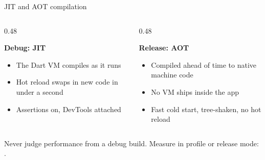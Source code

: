 \documentclass[10pt,aspectratio=169,t]{beamer}
\begin{document}
\begin{frame}[fragile,eyebrow=Flutter]{JIT and AOT compilation}
  \begin{columns}[T]
    \begin{column}{0.48\textwidth}
\begin{panel}
{\bfseries Debug: JIT}\par
{}
\vskip 1mm
\begin{itemize}
  \item The Dart VM compiles as it runs
  \item Hot reload swaps in new code in under a second
  \item Assertions on, DevTools attached
\end{itemize}
\end{panel}
    \end{column}
    \begin{column}{0.48\textwidth}
\begin{panel}
{\bfseries Release: AOT}\par
{}
\vskip 1mm
\begin{itemize}
  \item Compiled ahead of time to native machine code
  \item No VM ships inside the app
  \item Fast cold start, tree-shaken, no hot reload
\end{itemize}
\end{panel}
    \end{column}
  \end{columns}
  \begin{takeaway}{Never judge performance from a debug build.}
    Measure in profile or release mode: .
  \end{takeaway}
\end{frame}
\end{document}

